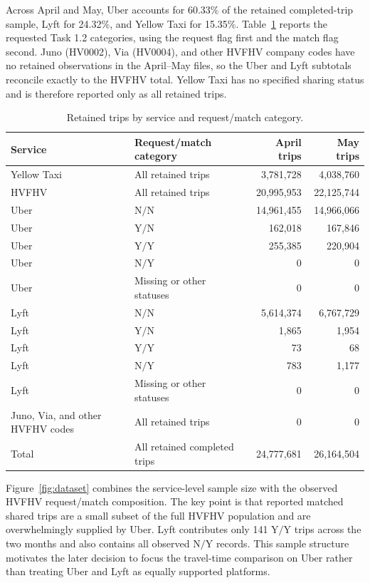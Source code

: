 \documentclass[10pt,a4paper]{article}
\newcommand{\NN}{\ensuremath{\mathrm{N/N}}}
\newcommand{\YN}{\ensuremath{\mathrm{Y/N}}}
\newcommand{\YY}{\ensuremath{\mathrm{Y/Y}}}
\newcommand{\NY}{\ensuremath{\mathrm{N/Y}}}
\begin{document}
Across April and May, Uber accounts for 60.33\% of the retained completed-trip sample, Lyft for 24.32\%, and Yellow Taxi for 15.35\%. Table~\ref{tab:sample} reports the requested Task 1.2 categories, using the request flag first and the match flag second. Juno (HV0002), Via (HV0004), and other HVFHV company codes have no retained observations in the April--May files, so the Uber and Lyft subtotals reconcile exactly to the HVFHV total. Yellow Taxi has no specified sharing status and is therefore reported only as all retained trips.

\begin{table}[!htbp]
\centering
\caption{Retained trips by service and request/match category.}
\label{tab:sample}
\small
\begin{tabularx}{\linewidth}{>{\raggedright\arraybackslash}p{3.0cm}>{\raggedright\arraybackslash}Xrr}
\toprule
Service & Request/match category & April trips & May trips \\
\midrule
Yellow Taxi & All retained trips & 3,781,728 & 4,038,760 \\
HVFHV & All retained trips & 20,995,953 & 22,125,744 \\
\midrule
Uber & \NN{} & 14,961,455 & 14,966,066 \\
Uber & \YN{} & 162,018 & 167,846 \\
Uber & \YY{} & 255,385 & 220,904 \\
Uber & \NY{} & 0 & 0 \\
Uber & Missing or other statuses & 0 & 0 \\
\midrule
Lyft & \NN{} & 5,614,374 & 6,767,729 \\
Lyft & \YN{} & 1,865 & 1,954 \\
Lyft & \YY{} & 73 & 68 \\
Lyft & \NY{} & 783 & 1,177 \\
Lyft & Missing or other statuses & 0 & 0 \\
\midrule
Juno, Via, and other HVFHV codes & All retained trips & 0 & 0 \\
\midrule
Total & All retained completed trips & 24,777,681 & 26,164,504 \\
\bottomrule
\end{tabularx}
\end{table}

Figure~\ref{fig:dataset} combines the service-level sample size with the observed HVFHV request/match composition. The key point is that reported matched shared trips are a small subset of the full HVFHV population and are overwhelmingly supplied by Uber. Lyft contributes only 141 \YY{} trips across the two months and also contains all observed \NY{} records. This sample structure motivates the later decision to focus the travel-time comparison on Uber rather than treating Uber and Lyft as equally supported platforms.
\end{document}
